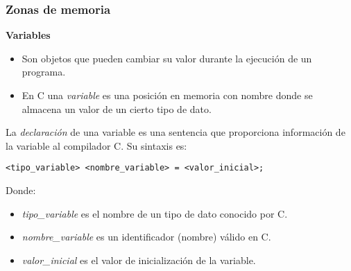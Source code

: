 \begin{frame}[fragile, t]
\frametitle{Zonas de memoria}
\textbf{Variables}\\
\footnotesize
\begin{itemize}
	\item Son objetos que pueden cambiar su valor durante la ejecución de un programa.
	\item En C una \textit{variable} es una posición en memoria con nombre donde se almacena un valor de un cierto tipo de dato.
\end{itemize}
\vspace{-2mm}
La \textit{declaración} de una variable es una sentencia que proporciona información de la variable al compilador C. Su sintaxis es:
\begin{lstlisting}
<tipo_variable> <nombre_variable> = <valor_inicial>;
\end{lstlisting}
\vspace{-4mm}
Donde:
\vspace{-4mm}
\begin{itemize}
	\item \textit{tipo\_variable} es el nombre de un tipo de dato conocido por C.
	\item \textit{nombre\_variable} es un identificador (nombre) válido en C.
	\item \textit{valor\_inicial} es el valor de inicialización de la variable.
\end{itemize}
\end{frame}

